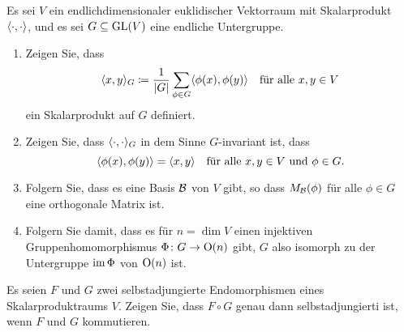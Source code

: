 \documentclass[a4paper,10pt]{scrartcl}
\begin{document}
\begin{question}
  Es sei $V$ ein endlichdimensionaler euklidischer Vektorraum mit Skalarprodukt $\langle \cdot, \cdot \rangle$, und es sei $G \subseteq \operatorname{GL}(V)$ eine endliche Untergruppe.
  \begin{enumerate}[leftmargin=*]
    \item
      Zeigen Sie, dass
      \[
        \langle x,y \rangle_G \coloneqq \frac{1}{|G|} \sum_{\phi \in G} \langle \phi(x), \phi(y) \rangle
        \quad
        \text{für alle $x, y \in V$}
      \]
      ein Skalarprodukt auf $G$ definiert.
    \item
      Zeigen Sie, dass $\langle \cdot, \cdot \rangle_G$ in dem Sinne $G$-invariant ist, dass
      \[
        \langle \phi(x), \phi(y) \rangle = \langle x,y \rangle
        \quad
        \text{für alle $x, y \in V$ und $\phi \in G$}.
      \]
    \item
      Folgern Sie, dass es eine Basis $\mathcal{B}$ von $V$ gibt, so dass $M_{\mathcal{B}}(\phi)$ für alle $\phi \in G$ eine orthogonale Matrix ist.
    \item
      Folgern Sie damit, dass es für $n = \dim V$ einen injektiven Gruppenhomomorphismus $\Phi \colon G \to \operatorname{O}(n)$ gibt, $G$ also isomorph zu der Untergruppe $\operatorname{im} \Phi$ von $\operatorname{O}(n)$ ist.
  \end{enumerate}
\end{question}


\begin{question}
  Es seien $F$ und $G$ zwei selbstadjungierte Endomorphismen eines Skalarproduktraums $V$.
  Zeigen Sie, dass $F \circ G$ genau dann selbstadjungierti ist, wenn $F$ und $G$ kommutieren.
\end{question}
\end{document}
